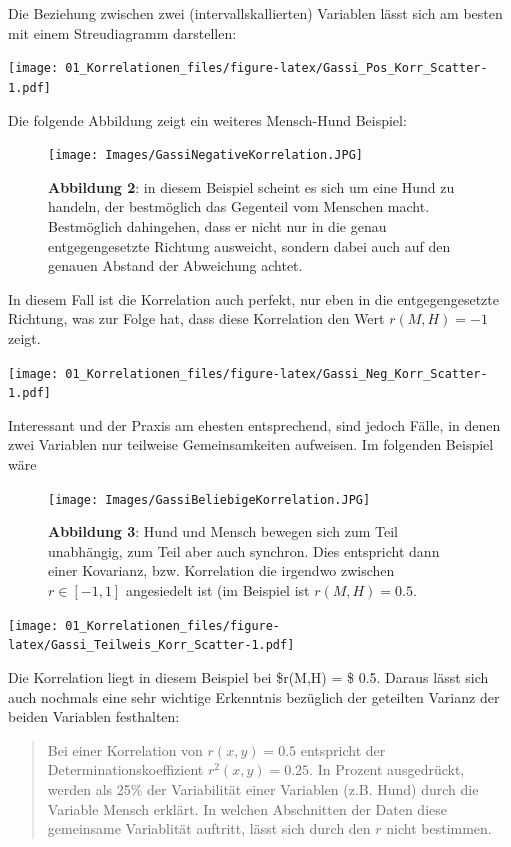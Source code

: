 \documentclass[]{article}
\begin{document}
Die Beziehung zwischen zwei (intervallskallierten) Variablen lässt sich am besten mit einem Streudiagramm darstellen:

\texttt{[image: 01\_Korrelationen\_files/figure-latex/Gassi\_Pos\_Korr\_Scatter-1.pdf]}

Die folgende Abbildung zeigt ein weiteres Mensch-Hund Beispiel:

\begin{figure}
\centering
\texttt{[image: Images/GassiNegativeKorrelation.JPG]}
\caption{\textbf{Abbildung 2}: in diesem Beispiel scheint es sich um eine Hund zu handeln, der bestmöglich das Gegenteil vom Menschen macht. Bestmöglich dahingehen, dass er nicht nur in die genau entgegengesetzte Richtung ausweicht, sondern dabei auch auf den genauen Abstand der Abweichung achtet.}
\end{figure}

In diesem Fall ist die Korrelation auch perfekt, nur eben in die entgegengesetzte Richtung, was zur Folge hat, dass diese Korrelation den Wert \(r(M,H) = -1\) zeigt.

\texttt{[image: 01\_Korrelationen\_files/figure-latex/Gassi\_Neg\_Korr\_Scatter-1.pdf]}

Interessant und der Praxis am ehesten entsprechend, sind jedoch Fälle, in denen zwei Variablen nur teilweise Gemeinsamkeiten aufweisen. Im folgenden Beispiel wäre

\begin{figure}
\centering
\texttt{[image: Images/GassiBeliebigeKorrelation.JPG]}
\caption{\textbf{Abbildung 3}: Hund und Mensch bewegen sich zum Teil unabhängig, zum Teil aber auch synchron. Dies entspricht dann einer Kovarianz, bzw. Korrelation die irgendwo zwischen \(r \in [-1, 1]\) angesiedelt ist (im Beispiel ist \(r(M,H) = 0.5\).}
\end{figure}

\texttt{[image: 01\_Korrelationen\_files/figure-latex/Gassi\_Teilweis\_Korr\_Scatter-1.pdf]}

Die Korrelation liegt in diesem Beispiel bei \$r(M,H) = \$ 0.5. Daraus lässt sich auch nochmals eine sehr wichtige Erkenntnis bezüglich der geteilten Varianz der beiden Variablen festhalten:

\begin{quote}
Bei einer Korrelation von \(r(x,y) = 0.5\) entspricht der Determinationskoeffizient \(r^2(x,y) = 0.25\). In Prozent ausgedrückt, werden als 25\% der Variabilität einer Variablen (z.B. Hund) durch die Variable Mensch erklärt. In welchen Abschnitten der Daten diese gemeinsame Variablität auftritt, lässt sich durch den \(r\) nicht bestimmen.
\end{quote}
\end{document}
